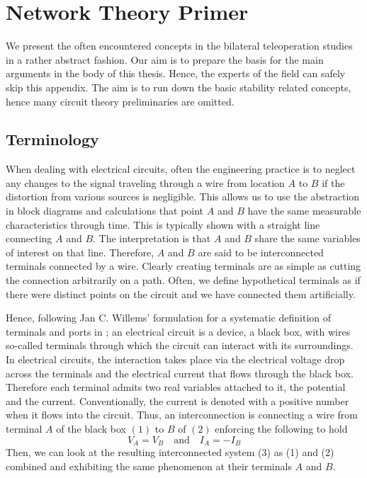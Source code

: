 \chapter{Network Theory Primer}
\label{chap:apdxnetwork}


We present the often encountered concepts in the bilateral teleoperation studies in a rather abstract fashion. Our aim is to
prepare the basis for the main arguments in the body of this thesis. Hence, the experts of the field can safely skip this appendix. 
The aim is to run down the basic stability related concepts, hence many circuit theory preliminaries are omitted.

\section{Terminology}
When dealing with electrical circuits, often the engineering practice is to neglect any changes to the signal traveling through 
a wire from location $A$ to $B$ if the distortion from various sources
is negligible. This allows us to use the abstraction in block diagrams and calculations that point
$A$ and $B$ have the same measurable characteristics through time. This is typically shown with a 
straight line connecting $A$ and $B$. The interpretation is that $A$ and $B$ share the same variables of 
interest on that line. Therefore, $A$ and $B$ are said to be interconnected terminals connected by a wire. 
Clearly creating terminals are as simple as cutting the connection arbitrarily on a path. Often, we define 
hypothetical terminals as if there were distinct points on the circuit and we have connected them artificially. 

Hence, following Jan C. Willems' formulation for a systematic definition of terminals and ports in \cite{willemsCSM}; 
an electrical circuit is a device, a black box, with wires so-called terminals
through which the circuit can interact with its surroundings. In electrical circuits, the interaction takes place
via the electrical voltage drop across the terminals and the electrical current that flows through the black box.
Therefore each terminal admits two real variables attached to it, the potential and the current. Conventionally, 
the current is denoted with a positive number when it flows into the circuit. Thus, an interconnection is connecting
a wire from terminal $A$ of the black box $(1)$ to $B$ of $(2)$ enforcing the following to hold
\[
V_A = V_B \quad \text{and} \quad I_A=-I_B
\]
Then, we can look at the resulting interconnected system (3) as (1) and (2) combined and exhibiting the same
phenomenon at their terminals $A$ and $B$. 

